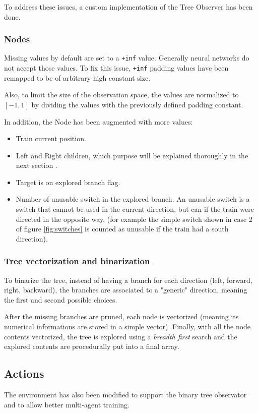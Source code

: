 \documentclass[13pt]{article}
\begin{document}
To address these issues, a custom implementation of the Tree Observer has been done.

\subsubsection{Nodes}
Missing values by default are set to a \texttt{+inf} value. Generally neural networks do not accept those values. To fix this issue, \texttt{+inf} padding values have been remapped to be of arbitrary high constant size.

Also, to limit the size of the observation space, the values are normalized to $[-1, 1]$ by dividing the values with the previously defined padding constant.

In addition, the Node has been augmented with more values:
\begin{itemize}
    \item Train current position.
    \item Left and Right children, which purpose will be explained thoroughly in the next section .
    \item Target is on explored branch flag.
    \item Number of unusable switch in the explored branch. An unusable switch is a switch that cannot be used in the current direction, but can if the train were directed in the opposite way, (for example the simple switch shown in case 2 of figure \ref{fig:switches} is counted as unusable if the train had a south direction).
\end{itemize}

\subsubsection{Tree vectorization and binarization}
To binarize the tree, instead of having a branch for each direction (left, forward, right, backward), the branches are associated to a "generic" direction, meaning the first and second possible choices.

After the missing branches are pruned, each node is vectorized (meaning its numerical informations are stored in a simple vector). Finally, with all the node contents vectorized, the tree is explored using a \textit{breadth first} search and the explored contents are procedurally put into a final array.

\subsection{Actions}
The environment has also been modified to support the binary tree observator and to allow better multi-agent training.
\end{document}
